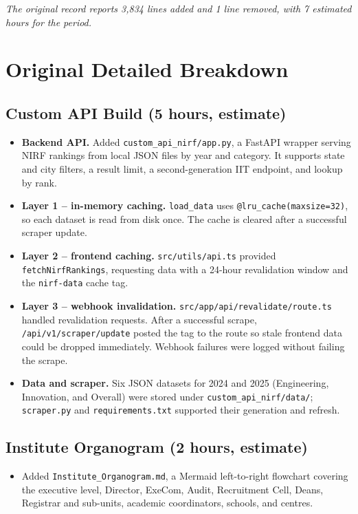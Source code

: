 \documentclass[11pt,a4paper]{article}
\begin{document}
\textit{The original record reports 3,834 lines added and 1 line removed, with 7 estimated hours for the period.}

\section*{Original Detailed Breakdown}
\subsection*{Custom API Build (5 hours, estimate)}
\begin{itemize}[leftmargin=1.4em,itemsep=2pt]
  \item \textbf{Backend API.} Added \texttt{custom\_api\_nirf/app.py}, a FastAPI wrapper serving NIRF rankings from local JSON files by year and category. It supports state and city filters, a result limit, a second-generation IIT endpoint, and lookup by rank.
  \item \textbf{Layer 1 -- in-memory caching.} \texttt{load\_data} uses \texttt{@lru\_cache(maxsize=32)}, so each dataset is read from disk once. The cache is cleared after a successful scraper update.
  \item \textbf{Layer 2 -- frontend caching.} \texttt{src/utils/api.ts} provided \texttt{fetchNirfRankings}, requesting data with a 24-hour revalidation window and the \texttt{nirf-data} cache tag.
  \item \textbf{Layer 3 -- webhook invalidation.} \texttt{src/app/api/revalidate/route.ts} handled revalidation requests. After a successful scrape, \texttt{/api/v1/scraper/update} posted the tag to the route so stale frontend data could be dropped immediately. Webhook failures were logged without failing the scrape.
  \item \textbf{Data and scraper.} Six JSON datasets for 2024 and 2025 (Engineering, Innovation, and Overall) were stored under \texttt{custom\_api\_nirf/data/}; \texttt{scraper.py} and \texttt{requirements.txt} supported their generation and refresh.
\end{itemize}

\subsection*{Institute Organogram (2 hours, estimate)}
\begin{itemize}[leftmargin=1.4em,itemsep=2pt]
  \item Added \texttt{Institute\_Organogram.md}, a Mermaid left-to-right flowchart covering the executive level, Director, ExeCom, Audit, Recruitment Cell, Deans, Registrar and sub-units, academic coordinators, schools, and centres.
\end{itemize}
\end{document}
